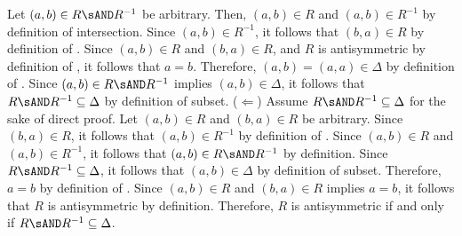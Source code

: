 \begin{enumerate}
\begin{enumerate}
\begin{subprove}
        Let $(a,b) \in R \sAND R^{-1}$ be arbitrary. 
        Then, $(a,b) \in R$ and $(a,b) \in R^{-1}$ by definition of intersection. 
        Since $(a,b) \in R^{-1}$, it follows that $(b,a) \in R$ by definition of . 
        Since $(a,b) \in R$ and $(b,a) \in R$, and $R$ is antisymmetric by definition of , 
        it follows that $a = b$. Therefore, $(a,b) = (a,a) \in \Delta$ by definition of .
        Since $(a,b) \in R \sAND R^{-1}$ implies $(a,b) \in \Delta$, it follows that $R \sAND R^{-1} \subseteq \Delta$ by definition of subset.
        \proofstep
        ($\Leftarrow$) Assume $R \sAND R^{-1} \subseteq \Delta$ for the sake of direct proof. 
        Let $(a,b) \in R$ and $(b,a) \in R$ be arbitrary. 
        Since $(b,a) \in R$, it follows that $(a,b) \in R^{-1}$ by definition of . 
        Since $(a,b) \in R$ and $(a,b) \in R^{-1}$, it follows that $(a,b) \in R \sAND R^{-1}$ by definition. 
        Since $R \sAND R^{-1} \subseteq \Delta$, it follows that $(a,b) \in \Delta$ by definition of subset. 
        Therefore, $a = b$ by definition of . 
        Since $(a,b) \in R$ and $(b,a) \in R$ implies $a = b$, it follows that $R$ is antisymmetric by definition.
        \proofstep
        Therefore, $R$ is antisymmetric if and only if $R \sAND R^{-1} \subseteq \Delta$.
      \end{subprove}
  \end{enumerate}



\end{enumerate}
